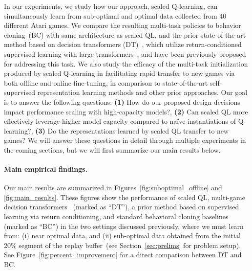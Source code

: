 In our experiments, we study how our approach, scaled Q-learning, can simultaneously learn from sub-optimal and optimal data collected from 40 different Atari games. 
We compare the resulting multi-task policies to behavior cloning~(BC) with same architecture as scaled QL, and the prior state-of-the-art method based on decision transformers (DT)~\citep{chen2021decision}, which utilize return-conditioned supervised learning with large transformers~\citep{lee2022multi}, and have been previously proposed for addressing this task. 
We also study the efficacy of the multi-task initialization produced by scaled Q-learning in facilitating rapid transfer to new games via both offline and online fine-tuning, in comparison to state-of-the-art self-supervised representation learning methods and other prior approaches. Our goal is to answer the following questions: \textbf{(1)} How do our proposed design decisions impact performance scaling with high-capacity models?, \textbf{(2)} Can scaled QL more effectively leverage higher model capacity compared to na\"ive instantiations of Q-learning?, \textbf{(3)} Do the representations learned by scaled QL transfer to new games? We will answer these questions in detail through multiple experiments in the coming sections, but we will first summarize our main results below.

 
\paragraph{Main empirical findings.} Our main results are summarized in Figures~\ref{fig:suboptimal_offline} and \ref{fig:main_results}. These figures show the performance of scaled QL, multi-game decision transformers~\citep{lee2022multi} (marked as ``DT''), a prior method based on supervised learning via return conditioning, and standard behavioral cloning baselines (marked as ``BC'') in the two settings discussed previously, where we must learn from: (i) near optimal data, and (ii) sub-optimal data obtained from the initial 20\% segment of the replay buffer~(see Section~\ref{sec:prelims} for problem setup). See Figure~\ref{fig:percent_improvement} for a direct comparison between DT and BC.



